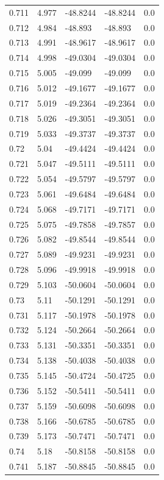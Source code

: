 \begin{table}[H]
\begin{tabular}{lllll}
0.711 & 4.977 & -48.8244 & -48.8244 & 0.0 \\
0.712 & 4.984 & -48.893 & -48.893 & 0.0 \\
0.713 & 4.991 & -48.9617 & -48.9617 & 0.0 \\
0.714 & 4.998 & -49.0304 & -49.0304 & 0.0 \\
0.715 & 5.005 & -49.099 & -49.099 & 0.0 \\
0.716 & 5.012 & -49.1677 & -49.1677 & 0.0 \\
0.717 & 5.019 & -49.2364 & -49.2364 & 0.0 \\
0.718 & 5.026 & -49.3051 & -49.3051 & 0.0 \\
0.719 & 5.033 & -49.3737 & -49.3737 & 0.0 \\
0.72 & 5.04 & -49.4424 & -49.4424 & 0.0 \\
0.721 & 5.047 & -49.5111 & -49.5111 & 0.0 \\
0.722 & 5.054 & -49.5797 & -49.5797 & 0.0 \\
0.723 & 5.061 & -49.6484 & -49.6484 & 0.0 \\
0.724 & 5.068 & -49.7171 & -49.7171 & 0.0 \\
0.725 & 5.075 & -49.7858 & -49.7857 & 0.0 \\
0.726 & 5.082 & -49.8544 & -49.8544 & 0.0 \\
0.727 & 5.089 & -49.9231 & -49.9231 & 0.0 \\
0.728 & 5.096 & -49.9918 & -49.9918 & 0.0 \\
0.729 & 5.103 & -50.0604 & -50.0604 & 0.0 \\
0.73 & 5.11 & -50.1291 & -50.1291 & 0.0 \\
0.731 & 5.117 & -50.1978 & -50.1978 & 0.0 \\
0.732 & 5.124 & -50.2664 & -50.2664 & 0.0 \\
0.733 & 5.131 & -50.3351 & -50.3351 & 0.0 \\
0.734 & 5.138 & -50.4038 & -50.4038 & 0.0 \\
0.735 & 5.145 & -50.4724 & -50.4725 & 0.0 \\
0.736 & 5.152 & -50.5411 & -50.5411 & 0.0 \\
0.737 & 5.159 & -50.6098 & -50.6098 & 0.0 \\
0.738 & 5.166 & -50.6785 & -50.6785 & 0.0 \\
0.739 & 5.173 & -50.7471 & -50.7471 & 0.0 \\
0.74 & 5.18 & -50.8158 & -50.8158 & 0.0 \\
0.741 & 5.187 & -50.8845 & -50.8845 & 0.0 \\

\end{tabular}
\end{table}
